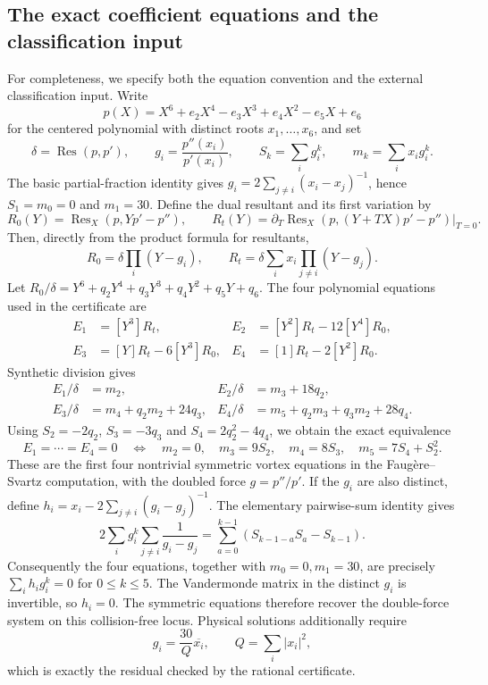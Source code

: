 \documentclass[11pt]{article}
\theoremstyle{remark}
\numberwithin{equation}{section}
\begin{document}
\subsection{The exact coefficient equations and the classification input}
\label{subsec:fs6-equations-audit}
For completeness, we specify both the equation convention and the external
classification input. Write
\[
 p(X)=X^6+e_2X^4-e_3X^3+e_4X^2-e_5X+e_6
\]
for the centered polynomial with distinct roots $x_1,\ldots,x_6$, and set
\[
 \delta=\operatorname{Res}(p,p'),\qquad
 g_i=\frac{p''(x_i)}{p'(x_i)},\qquad
 S_k=\sum_i g_i^k,\qquad m_k=\sum_i x_i g_i^k.
\]
The basic partial-fraction identity gives
$g_i=2\sum_{j\ne i}(x_i-x_j)^{-1}$, hence
$S_1=m_0=0$ and $m_1=30$.
Define the dual resultant and its first variation by
\[
 R_0(Y)=\operatorname{Res}_X(p,Yp'-p''),\qquad
 R_t(Y)=\left.\partial_T\operatorname{Res}_X
 (p,(Y+TX)p'-p'')\right|_{T=0}.
\]
Then, directly from the product formula for resultants,
\[
 R_0=\delta\prod_i(Y-g_i),\qquad
 R_t=\delta\sum_i x_i\prod_{j\ne i}(Y-g_j).
\]
Let $R_0/\delta=Y^6+q_2Y^4+q_3Y^3+q_4Y^2+q_5Y+q_6$.
The four polynomial equations used in the certificate are
\begin{align*}
 E_1&=[Y^3]R_t, & E_2&=[Y^2]R_t-12[Y^4]R_0,\\
 E_3&=[Y]R_t-6[Y^3]R_0, & E_4&=[1]R_t-2[Y^2]R_0.
\end{align*}
Synthetic division gives
\begin{align*}
 E_1/\delta&=m_2, & E_2/\delta&=m_3+18q_2,\\
 E_3/\delta&=m_4+q_2m_2+24q_3,
 &E_4/\delta&=m_5+q_2m_3+q_3m_2+28q_4.
\end{align*}
Using $S_2=-2q_2$, $S_3=-3q_3$ and
$S_4=2q_2^2-4q_4$, we obtain the exact equivalence
\[
 E_1=\cdots=E_4=0
 \quad\Longleftrightarrow\quad
 m_2=0,\quad m_3=9S_2,\quad m_4=8S_3,
 \quad m_5=7S_4+S_2^2.
\]
These are the first four nontrivial symmetric vortex equations in the
Faug\`ere--Svartz computation, with the doubled force $g=p''/p'$.
If the $g_i$ are also distinct, define
$h_i=x_i-2\sum_{j\ne i}(g_i-g_j)^{-1}$.
The elementary pairwise-sum identity gives
\[
 2\sum_i g_i^k\sum_{j\ne i}\frac1{g_i-g_j}
 =\sum_{a=0}^{k-1}(S_{k-1-a}S_a-S_{k-1}).
\]
Consequently the four equations, together with $m_0=0,m_1=30$,
are precisely $\sum_i h_i g_i^k=0$ for $0\le k\le5$.
The Vandermonde matrix in the distinct $g_i$ is invertible, so $h_i=0$.
The symmetric equations therefore recover the double-force system on this
collision-free locus. Physical solutions additionally require
\[
 g_i=\frac{30}{Q}\overline{x_i},\qquad Q=\sum_i|x_i|^2,
\]
which is exactly the residual checked by the rational certificate.
\end{document}
